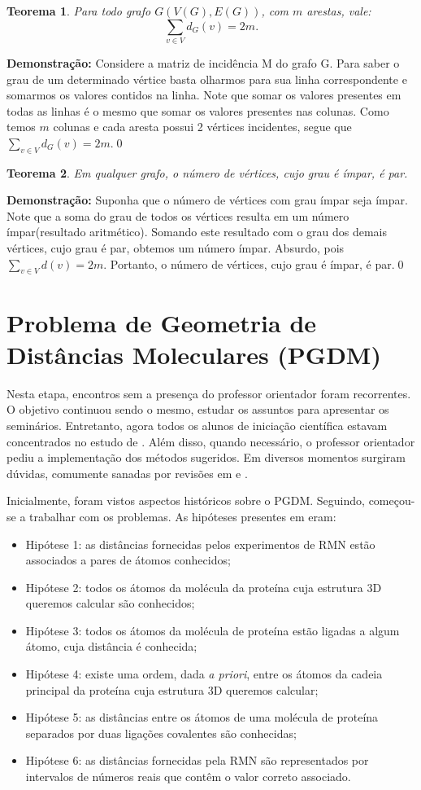 \documentclass[
	12pt,				%
	openright,			%
	twoside,			%
	a4paper,			%
	english,			%
	french,				%
	spanish,			%
	brazil				%
	]{abntex2}
\newtheorem{teorema}{Teorema}[section]
\newcommand {\dem}{\textbf{Demonstração:} }
\begin{document}
\begin{teorema}
Para todo grafo $G(V(G),E(G))$, com $m$ arestas, vale:
$$
\sum\limits_{v\in V}{d_{G}(v)=2m}.
$$
\end{teorema}
\noindent\dem Considere a matriz de incidência M do grafo G. Para saber o grau de um determinado vértice basta olharmos para sua linha correspondente e somarmos os valores contidos na linha. Note que somar os valores presentes em todas as linhas é o mesmo que somar os valores presentes nas colunas. Como temos $m$ colunas e cada aresta possui 2 vértices incidentes, segue que $\sum\limits_{v\in V}{d_{G}(v)=2m}$.\qed

\begin{teorema}
Em qualquer grafo, o número de vértices, cujo grau é ímpar, é par.
\end{teorema}
\noindent\dem Suponha que o número de vértices com grau ímpar seja ímpar. Note que a soma do grau de todos os vértices resulta em um número ímpar(resultado aritmético). Somando este resultado com o grau dos demais vértices, cujo grau é par, obtemos um número ímpar. Absurdo, pois $\sum\limits_{v\in V}{d(v)=2m}$. Portanto, o número de vértices, cujo grau é ímpar, é par.\qed

\section{Problema de Geometria de Distâncias Moleculares (PGDM)}
Nesta etapa, encontros sem a presença do professor orientador foram recorrentes. O objetivo continuou sendo o mesmo, estudar os assuntos para apresentar os seminários. Entretanto, agora todos os alunos de iniciação científica estavam concentrados no estudo de \cite{1}. Além disso, quando necessário, o professor orientador pediu a implementação dos métodos sugeridos. Em diversos momentos surgiram dúvidas, comumente sanadas por revisões em \cite{algebralinear} e \cite{calculo}.

Inicialmente, foram vistos aspectos históricos sobre o PGDM. Seguindo, começou-se a trabalhar com os problemas. As hipóteses presentes em \cite{1} eram:

	\begin{itemize}
		\item Hipótese 1: as distâncias fornecidas pelos experimentos de RMN estão associados a pares de átomos conhecidos;
		\item Hipótese 2: todos os átomos da molécula da proteína cuja estrutura 3D queremos calcular são conhecidos;
		\item Hipótese 3: todos os átomos da molécula de proteína estão ligadas a algum átomo, cuja distância é conhecida;
		\item Hipótese 4: existe uma ordem, dada \textit{a priori}, entre os átomos da cadeia principal da proteína cuja estrutura 3D queremos calcular;
		\item Hipótese 5: as distâncias entre os átomos de uma molécula de proteína separados por duas ligações covalentes são conhecidas;
		\item Hipótese 6: as distâncias fornecidas pela RMN são representados por intervalos de números reais que contêm o valor correto associado.
	\end{itemize}
\end{document}
